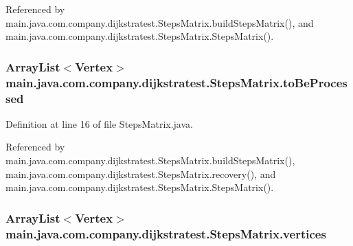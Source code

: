Referenced by main.\-java.\-com.\-company.\-dijkstratest.\-Steps\-Matrix.\-build\-Steps\-Matrix(), and main.\-java.\-com.\-company.\-dijkstratest.\-Steps\-Matrix.\-Steps\-Matrix().

\hypertarget{classmain_1_1java_1_1com_1_1company_1_1dijkstratest_1_1_steps_matrix_aa51c97e07faba7d835f614554810ab44}{
\subsubsection[{to\-Be\-Processed}]{\setlength{\rightskip}{0pt plus 5cm}Array\-List$<${\bf Vertex}$>$ main.\-java.\-com.\-company.\-dijkstratest.\-Steps\-Matrix.\-to\-Be\-Processed\hspace{0.3cm}{\ttfamily [private]}}}\label{classmain_1_1java_1_1com_1_1company_1_1dijkstratest_1_1_steps_matrix_aa51c97e07faba7d835f614554810ab44}


Definition at line 16 of file Steps\-Matrix.\-java.



Referenced by main.\-java.\-com.\-company.\-dijkstratest.\-Steps\-Matrix.\-build\-Steps\-Matrix(), main.\-java.\-com.\-company.\-dijkstratest.\-Steps\-Matrix.\-recovery(), and main.\-java.\-com.\-company.\-dijkstratest.\-Steps\-Matrix.\-Steps\-Matrix().

\hypertarget{classmain_1_1java_1_1com_1_1company_1_1dijkstratest_1_1_steps_matrix_a1a3eb1ca85e39b9b704bfe7e26256afb}{
\subsubsection[{vertices}]{\setlength{\rightskip}{0pt plus 5cm}Array\-List$<${\bf Vertex}$>$ main.\-java.\-com.\-company.\-dijkstratest.\-Steps\-Matrix.\-vertices\hspace{0.3cm}{\ttfamily [private]}}}\label{classmain_1_1java_1_1com_1_1company_1_1dijkstratest_1_1_steps_matrix_a1a3eb1ca85e39b9b704bfe7e26256afb}


